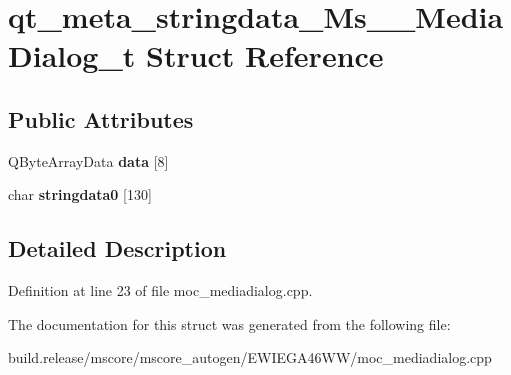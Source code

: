 \hypertarget{structqt__meta__stringdata___ms_____media_dialog__t}{}\section{qt\+\_\+meta\+\_\+stringdata\+\_\+\+Ms\+\_\+\+\_\+\+Media\+Dialog\+\_\+t Struct Reference}
\label{structqt__meta__stringdata___ms_____media_dialog__t}
\subsection*{Public Attributes}
\begin{DoxyCompactItemize}
\item 
\mbox{\label{structqt__meta__stringdata___ms_____media_dialog__t_a5d56f94dbff98683ce5fc9b5abd83d0a}} 
Q\+Byte\+Array\+Data {\bfseries data} \mbox{[}8\mbox{]}
\item 
\mbox{\label{structqt__meta__stringdata___ms_____media_dialog__t_ad6eb39d287f59e5bca643bb4329e3883}} 
char {\bfseries stringdata0} \mbox{[}130\mbox{]}
\end{DoxyCompactItemize}


\subsection{Detailed Description}


Definition at line 23 of file moc\+\_\+mediadialog.\+cpp.



The documentation for this struct was generated from the following file\+:\begin{DoxyCompactItemize}
\item 
build.\+release/mscore/mscore\+\_\+autogen/\+E\+W\+I\+E\+G\+A46\+W\+W/moc\+\_\+mediadialog.\+cpp\end{DoxyCompactItemize}
